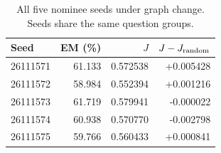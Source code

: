 \begin{table}[t]
\centering\small
\begin{tabular}{lrrr}
\toprule
Seed & EM (\%) & $J$ & $J-J_{\rm random}$ \\
\midrule
26111571 & 61.133 & 0.572538 & +0.005428 \\
26111572 & 58.984 & 0.552394 & +0.001216 \\
26111573 & 61.719 & 0.579941 & -0.000022 \\
26111574 & 60.938 & 0.570770 & -0.002798 \\
26111575 & 59.766 & 0.560433 & +0.000841 \\
\bottomrule
\end{tabular}
\caption{All five nominee seeds under graph change. Seeds share the same question groups.}
\label{tab:seeds}
\end{table}
